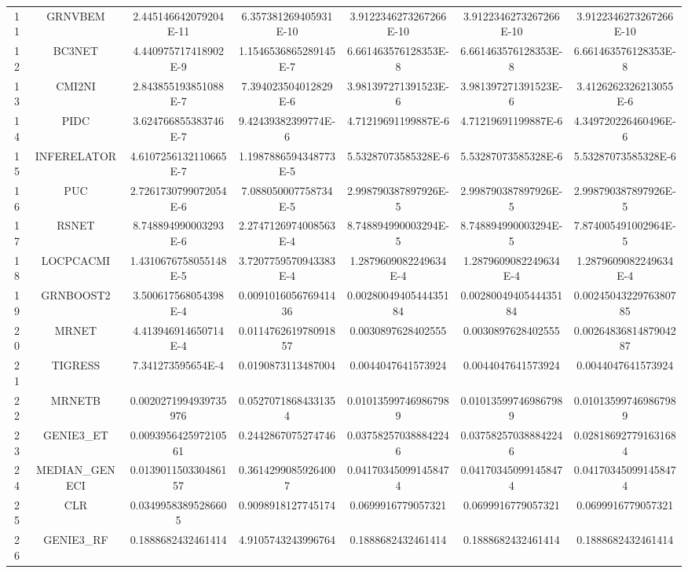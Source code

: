 \documentclass[a4paper,10pt]{article}
\begin{document}
\begin{landscape}
\begin{table}[!htp]
\begin{tabular}{ccccccc}
11&GRNVBEM&2.445146642079204E-11&6.357381269405931E-10&3.9122346273267266E-10&3.9122346273267266E-10&3.9122346273267266E-10\\
12&BC3NET&4.440975717418902E-9&1.1546536865289145E-7&6.661463576128353E-8&6.661463576128353E-8&6.661463576128353E-8\\
13&CMI2NI&2.843855193851088E-7&7.394023504012829E-6&3.981397271391523E-6&3.981397271391523E-6&3.4126262326213055E-6\\
14&PIDC&3.624766855383746E-7&9.42439382399774E-6&4.71219691199887E-6&4.71219691199887E-6&4.349720226460496E-6\\
15&INFERELATOR&4.6107256132110665E-7&1.1987886594348773E-5&5.53287073585328E-6&5.53287073585328E-6&5.53287073585328E-6\\
16&PUC&2.7261730799072054E-6&7.088050007758734E-5&2.998790387897926E-5&2.998790387897926E-5&2.998790387897926E-5\\
17&RSNET&8.748894990003293E-6&2.2747126974008563E-4&8.748894990003294E-5&8.748894990003294E-5&7.874005491002964E-5\\
18&LOCPCACMI&1.4310676758055148E-5&3.7207759570943383E-4&1.2879609082249634E-4&1.2879609082249634E-4&1.2879609082249634E-4\\
19&GRNBOOST2&3.500617568054398E-4&0.009101605676941436&0.0028004940544435184&0.0028004940544435184&0.0024504322976380785\\
20&MRNET&4.413946914650714E-4&0.011476261978091857&0.0030897628402555&0.0030897628402555&0.0026483681487904287\\
21&TIGRESS&7.341273595654E-4&0.0190873113487004&0.0044047641573924&0.0044047641573924&0.0044047641573924\\
22&MRNETB&0.0020271994939735976&0.05270718684331354&0.010135997469867989&0.010135997469867989&0.010135997469867989\\
23&GENIE3_ET&0.009395642597210561&0.2442867075274746&0.037582570388842246&0.037582570388842246&0.028186927791631684\\
24&MEDIAN_GENECI&0.013901150330486157&0.36142990859264007&0.041703450991458474&0.041703450991458474&0.041703450991458474\\
25&CLR&0.03499583895286605&0.9098918127745174&0.0699916779057321&0.0699916779057321&0.0699916779057321\\
26&GENIE3_RF&0.1888682432461414&4.9105743243996764&0.1888682432461414&0.1888682432461414&0.1888682432461414\\
\hline
\end{tabular}
\end{table}


\end{landscape}
\end{document}
